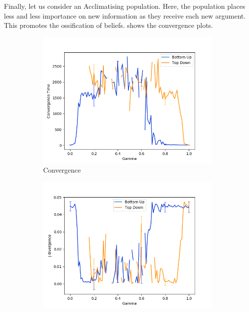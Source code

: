 Finally, let us consider an Acclimatising population. Here, the population places less and less importance on new information as they receive each new argument. This promotes the ossification of beliefs.  shows the convergence plots. 


\begin{figure}[H]
 \centering
  \begin{subfigure}[ht]{0.45\textwidth}
    \includegraphics[width=\textwidth]{Images/Figures/ListenerModelPlots/Ageing/AgeingConvergenceDONTDELETE.png}
    \caption{Convergence}
 \end{subfigure}
 \hfill
 \begin{subfigure}[ht]{0.45\textwidth}
    \includegraphics[width=\textwidth]{Images/Figures/ListenerModelPlots/Ageing/AgeingJ-DivDONTDELETE.png}

\end{subfigure}
\end{figure}
